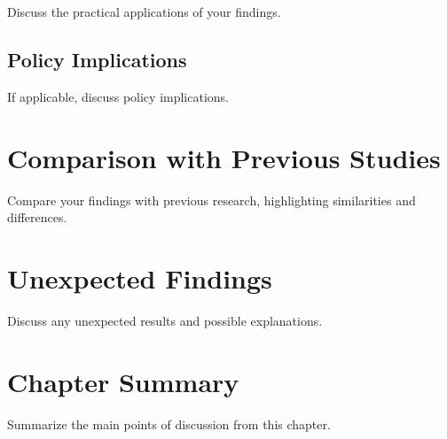 Discuss the practical applications of your findings.

\subsection{Policy Implications}

If applicable, discuss policy implications.

\section{Comparison with Previous Studies}

Compare your findings with previous research, highlighting similarities and differences.

\section{Unexpected Findings}

Discuss any unexpected results and possible explanations.

\section{Chapter Summary}

Summarize the main points of discussion from this chapter.
